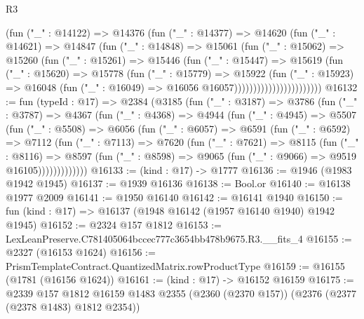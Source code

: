 \begin{lexlean}{R3}
\begin{coremodule}
                            (fun ("_" : @14122) =>
                            @14376
                              (fun ("_" : @14377) =>
                              @14620
                                (fun ("_" : @14621) =>
                                @14847
                                  (fun ("_" : @14848) =>
                                  @15061
                                    (fun ("_" : @15062) =>
                                    @15260
                                      (fun ("_" : @15261) =>
                                      @15446
                                        (fun ("_" : @15447) =>
                                        @15619
                                          (fun ("_" : @15620) =>
                                          @15778
                                            (fun ("_" : @15779) =>
                                            @15922
                                              (fun ("_" : @15923) =>
                                              @16048
                                                (fun ("_" : @16049) =>
                                                @16056 @16057)))))))))))))))))))))))
@16132 := fun (typeId : @17) =>
  @2384
    (@3185
      (fun ("_" : @3187) =>
      @3786
        (fun ("_" : @3787) =>
        @4367
          (fun ("_" : @4368) =>
          @4944
            (fun ("_" : @4945) =>
            @5507
              (fun ("_" : @5508) =>
              @6056
                (fun ("_" : @6057) =>
                @6591
                  (fun ("_" : @6592) =>
                  @7112
                    (fun ("_" : @7113) =>
                    @7620
                      (fun ("_" : @7621) =>
                      @8115
                        (fun ("_" : @8116) =>
                        @8597
                          (fun ("_" : @8598) =>
                          @9065 (fun ("_" : @9066) => @9519 @16105)))))))))))))
@16133 := (kind : @17) -> @1777
@16136 := @1946 (@1983 @1942 @1945)
@16137 := @1939 @16136
@16138 := Bool.or
@16140 := @16138 @1977 @2009
@16141 := @1950 @16140
@16142 := @16141 @1940
@16150 := fun (kind : @17) => @16137 (@1948 @16142 (@1957 @16140 @1940) @1942 @1945)
@16152 := @2324 @157 @1812
@16153 := LexLeanPreserve.C781405064bccec777c3654bb478b9675.R3.__fits_4
@16155 := @2327 (@16153 @1624)
@16156 := PrismTemplateContract.QuantizedMatrix.rowProductType
@16159 := @16155 (@1781 (@16156 @1624))
@16161 := (kind : @17) -> @16152 @16159
@16175 := @2339
    @157
    @1812
    @16159
    @1483
    @2355
    (@2360 (@2370 @157))
    (@2376 (@2377 (@2378 @1483) @1812 @2354))

\end{coremodule}
\end{lexlean}
